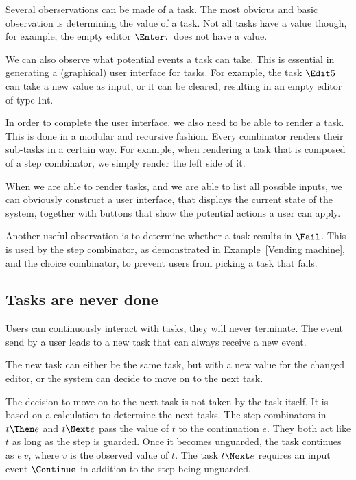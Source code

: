 Several oberservations can be made of a task. The most obvious and basic
observation is determining the value of a task. Not all tasks have a value
though, for example, the empty editor $\Enter \tau$ does not have a value.

We can also observe what potential events a task can take. This is essential in
generating a (graphical) user interface for tasks. For example, the task
$\Edit 5$ can take a new value as input, or it can be cleared, resulting in an
empty editor of type Int.

In order to complete the user interface, we also need to be able to render a
task. This is done in a modular and recursive fashion. Every combinator renders
their sub-tasks in a certain way. For example, when rendering a task that is
composed of a step combinator, we simply render the left side of it.

When we are able to render tasks, and we are able to list all possible inputs,
we can obviously construct a user interface, that displays the current state of
the system, together with buttons that show the potential actions a user can
apply.

Another useful observation is to determine whether a task results in $\Fail$.
This is used by the step combinator, as demonstrated in
Example~\ref{Vending machine}, and the choice combinator, to prevent users from
picking a task that fails.


\subsection{Tasks are never done}

Users can continuously interact with tasks, they will never terminate. The event
send by a user leads to a new task that can always receive a new event.

The new task can either be the same task, but with a new value for the changed
editor, or the system can decide to move on to the next task.

The decision to move on to the next task is not taken by the task itself.
It is based on a calculation to determine the next tasks.
The step combinators in $t \Then e$ and $t \Next e$ pass the value of $t$ to the continuation $e$.
They both act like $t$ as long as the step is guarded.
Once it becomes unguarded, the task continues as $e\ v$, where $v$ is the observed value of $t$.
The task $t \Next e$ requires an input event $\Continue$ in addition to the step being unguarded. %

